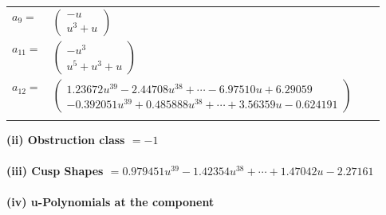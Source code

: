 \documentclass[1p]{elsarticle_modified}
\theoremstyle{definition}
\begin{document}
\begin{tabular}{m{7pt} m{180pt} m{7pt} m{180pt} }
\flushright $a_{9}=$&$\begin{pmatrix}- u\\u^3+u\end{pmatrix}$ \\
\flushright $a_{11}=$&$\begin{pmatrix}- u^3\\u^5+u^3+u\end{pmatrix}$ \\
\flushright $a_{12}=$&$\begin{pmatrix}1.23672 u^{39}-2.44708 u^{38}+\cdots-6.97510 u+6.29059\\-0.392051 u^{39}+0.485888 u^{38}+\cdots+3.56359 u-0.624191\end{pmatrix}$\\&\end{tabular}
\flushleft \textbf{(ii) Obstruction class $= -1$}\\~\\
\flushleft \textbf{(iii) Cusp Shapes $= 0.979451 u^{39}-1.42354 u^{38}+\cdots+1.47042 u-2.27161$}\\~\\
\newpage\renewcommand{\arraystretch}{1}
\flushleft \textbf{(iv) u-Polynomials at the component}\newline \\
\end{document}
